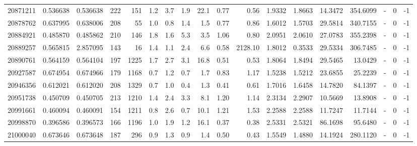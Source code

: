 \begin{tabular}{rrrrrrrrrrrrrrrlrr}
  20871211 & 0.536638 &   0.536638 &  222 &  151 &      1.2 &      3.7 &     1.9 &     22.1 &       0.77 &        0.56 &  1.9332 &  1.8663 &   14.3472 &  354.6099 &             - &        0 &         -1 \\
  20878762 & 0.637995 &   0.638006 &  208 &   55 &      1.0 &      0.8 &     1.4 &      1.5 &       0.77 &        0.86 &  1.6012 &  1.5703 &   29.5814 &  340.7155 &             - &        0 &         -1 \\
  20884921 & 0.485870 &   0.485862 &  210 &  146 &      1.8 &      1.6 &     5.3 &      3.5 &       1.06 &        0.80 &  2.0951 &  2.0610 &   27.0783 &  355.2398 &             - &        0 &         -1 \\
  20889257 & 0.565815 &   2.857095 &  143 &   16 &      1.4 &      1.1 &     2.4 &      6.6 &       0.58 &     2128.10 &  1.8012 &  0.3533 &   29.5334 &  306.7485 &             - &        0 &         -1 \\
  20890761 & 0.564159 &   0.564104 &  197 & 1225 &      1.7 &      2.7 &     3.1 &     16.8 &       0.51 &        0.53 &  1.8064 &  1.8494 &   29.5465 &   13.0429 &             - &        0 &         -1 \\
  20927587 & 0.674954 &   0.674966 &  179 & 1168 &      0.7 &      1.2 &     0.7 &      1.7 &       0.83 &        1.17 &  1.5238 &  1.5212 &   23.6855 &   25.2239 &             - &        0 &         -1 \\
  20946356 & 0.612021 &   0.612020 &  208 & 1329 &      0.7 &      1.0 &     0.4 &      1.3 &       0.41 &        0.61 &  1.7016 &  1.6458 &   14.7820 &   84.1397 &             - &        0 &         -1 \\
  20951738 & 0.450709 &   0.450705 &  213 & 1210 &      1.4 &      2.4 &     3.3 &      8.1 &       1.20 &        1.14 &  2.3134 &  2.2907 &   10.5669 &   13.8908 &             - &        0 &         -1 \\
  20991661 & 0.460094 &   0.460091 &  154 & 1211 &      0.8 &      2.6 &     0.7 &     10.1 &       1.21 &        1.53 &  2.2588 &  2.2588 &   11.7247 &   11.7144 &             - &        0 &         -1 \\
  20998870 & 0.396586 &   0.396573 &  166 & 1196 &      1.0 &      1.9 &     1.2 &     16.1 &       0.37 &        0.38 &  2.5331 &  2.5321 &   86.1698 &   95.6480 &             - &        0 &         -1 \\
  21000040 & 0.673646 &   0.673648 &  187 &  296 &      0.9 &      1.3 &     0.9 &      1.4 &       0.50 &        0.43 &  1.5549 &  1.4880 &   14.1924 &  280.1120 &             - &        0 &         -1 \\

\end{tabular}
